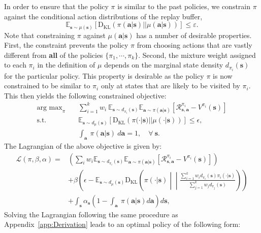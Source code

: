 \documentclass{article} \usepackage{iclr2020_conference,times}
\def\rva{{\mathbf{a}}}
\def\rvs{{\mathbf{s}}}
\newcommand{\weighti}{w_i}
\newcommand{\pii}{\pi_i}
\newcommand{\expec}{\mathbb{E}}
\begin{document}
In order to ensure that the policy $\pi$ is similar to the past policies, we constrain $\pi$ against the conditional action distributions of the replay buffer,
\begin{equation}
    \label{app_eqn:kl_constraint}
    \expec_{\rvs \sim \mu(\rvs)}\left[ \mathrm{D_{KL}}\left(\pi(\rva|\rvs) \Big| \Big| \mu(\rva|\rvs) \right) \right] \leq \varepsilon .
\end{equation}
Note that constraining $\pi$ against $\mu(\rva|\rvs)$ has a number of desirable properties. First, the constraint prevents the policy $\pi$ from choosing actions that are vastly different from \textbf{all} of the policies $\{\pi_1, \cdots, \pi_k\}$. Second, the mixture weight assigned to each $\pi_i$ in the definition of $\mu$ depends on the marginal state density $d_{\pii}(\rvs)$ for the particular policy. This property is desirable as the policy $\pi$ is now constrained to be similar to $\pi_i$ only at states that are likely to be visited by $\pii$. This then yields the following constrained objective:
\begin{align}
    \mathop{\mathrm{arg \ max}}_{\pi} \quad & \sum_{i=1}^k \weighti \ \expec_{\rvs \sim d_{\pii}(\rvs)} \expec_{\rva \sim \pi(\rva | \rvs)} \left[\mathcal{R}_{\rvs,\rva}^{\pii} - V^{\pii}(\rvs)\right] \\
    \textrm{s.t.} \quad & \expec_{\rvs \sim d_\mu(\rvs)} \left[\mathrm{D_{KL}} \left( \pi(\cdot |\rvs) || \mu(\cdot |\rvs) \right)\right] \leq \epsilon,\\
    & \int_\rva \ \pi(\rva | \rvs) \ d\rva = 1, \quad \forall \ \rvs.
\end{align}
The Lagrangian of the above objective is given by:
\begin{equation}
\begin{aligned}
    \mathcal{L}(\pi, \beta, \alpha) = & \left( \sum_i \weighti \expec_{\rvs \sim d_{\pii}(\rvs)} \expec_{\rva \sim \pi(\rva | \rvs)} \left[\mathcal{R}_{\rvs,\rva}^{\pii} - V^{\pii}(\rvs)\right]  \right) \\
    & + \beta \left(\epsilon - \expec_{\rvs \sim d_\mu(\rvs)} \mathrm{D_{KL}} \left(\pi(\cdot |\rvs) \middle|\middle| \frac{\sum_{i=1}^k \weighti d_{\pii}(\rvs) \pi_i(\cdot|\rvs)}{\sum_{j=1}^k w_j d_{\pi_j}(\rvs)} \right) \right)\\
    & + \int_{\rvs} \alpha_\rvs \left(1 - \int_\rva \ \pi(\rva | \rvs) d\rva \right) d\rvs,
\end{aligned}
\end{equation}
Solving the Lagrangian following the same procedure as Appendix~\ref{app:Derivation} leads to an optimal policy of the following form:
\end{document}
